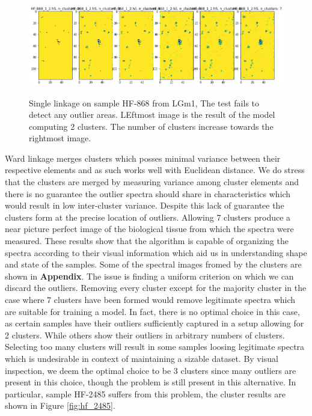\begin{figure}[H]

    \centering
{\includegraphics[width=15cm]{images/Complete_linkage/LGm-1/HF-868_1_2.h5_0.png} }
\caption{Single linkage on sample HF-868 from LGm1, The test fails to detect any outlier areas. LEftmost image is the result of the model computing 2 clusters. The number of clusters increase towards the rightmost image.\label{fig:SL_HF868}}%

\end{figure}

Ward linkage merges clusters which posses minimal variance between their respective elements and as such works well with Euclidean distance. We do stress that the clusters are merged by measuring variance among cluster elements and there is no guarantee the outlier spectra should share in characteristics which would result in low inter-cluster variance. Despite this lack of guarantee the clusters form at the precise location of outliers. Allowing 7 clusters produce a near picture perfect image of the biological tissue from which the spectra were measured. These results show that the algorithm is capable of organizing the spectra according to their visual information which aid us in understanding shape and state of the samples. Some of the spectral images fromed by the clusters are shown in \textbf{Appendix}. The issue is finding a uniform criterion on which we can discard the outliers. Removing every cluster except for the majority cluster in the case where 7 clusters have been formed would remove legitimate spectra which are suitable for training a model. In fact, there is no optimal choice in this case, as certain samples have their outliers sufficiently captured in a setup allowing for 2 clusters. While others show their outliers in arbitrary numbers of clusters. Selecting too many clusters will result in some samples loosing legitimate spectra which is undesirable in context of maintaining a sizable dataset. By visual inspection, we deem the optimal choice to be 3 clusters since many outliers are present in this choice, though the problem is still present in this alternative. In particular, sample HF-2485 suffers from this problem, the cluster results are shown in Figure \ref{fig:hf_2485}.

